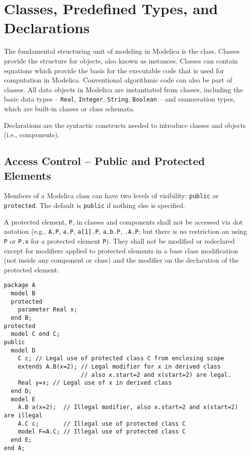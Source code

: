 \chapter{Classes, Predefined Types, and Declarations}\label{class-predefined-types-and-declarations}

The fundamental structuring unit of modeling in Modelica is the class.
Classes provide the structure for objects, also known as instances.
Classes can contain equations which provide the basis for the executable
code that is used for computation in Modelica. Conventional algorithmic
code can also be part of classes. All data objects in Modelica are
instantiated from classes, including the basic data types -- \lstinline!Real!,
\lstinline!Integer!, \lstinline!String!, \lstinline!Boolean! -- and enumeration types, which are built-in
classes or class schemata.

Declarations are the syntactic constructs needed to introduce classes
and objects (i.e., components).

\section{Access Control -- Public and Protected Elements}\label{access-control-public-and-protected-elements}

Members of a Modelica class can have two levels of visibility: \lstinline!public! or \lstinline!protected!.
The default is \lstinline!public! if nothing else is specified.

A protected element, \lstinline!P!, in classes and components shall not be accessed via dot notation (e.g., \lstinline!A.P!, \lstinline!a.P!, \lstinline!a[1].P!, \lstinline!a.b.P!, \lstinline!.A.P!; but there is no restriction on using \lstinline!P! or \lstinline!P.x! for a protected element \lstinline!P!).
They shall not be modified or redeclared except for modifiers applied to protected elements in a base class modification (not inside any component or class) and the modifier on the declaration of the protected element.

\begin{example}
\begin{lstlisting}[language=modelica]
package A
  model B
  protected
    parameter Real x;
  end B;
protected
  model C end C;
public
  model D
    C c; // Legal use of protected class C from enclosing scope
    extends A.B(x=2); // Legal modifier for x in derived class
                      // also x.start=2 and x(start=2) are legal.
    Real y=x; // Legal use of x in derived class
  end D;
  model E
    A.B a(x=2);  // Illegal modifier, also x.start=2 and x(start=2) are illegal
    A.C c;       // Illegal use of protected class C
    model F=A.C; // Illegal use of protected class C
  end E;
end A;
\end{lstlisting}
\end{example}

